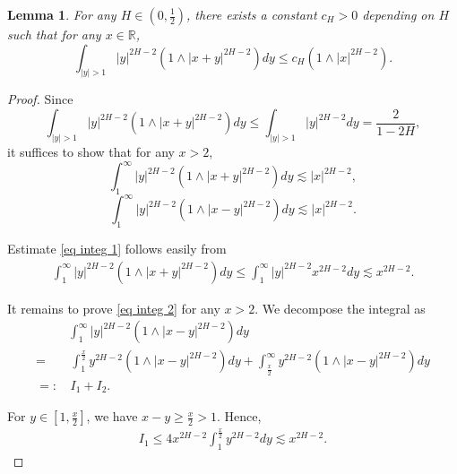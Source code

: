 \documentclass[11pt,reqno]{amsart}
\numberwithin{equation}{section}
\newtheorem{lemma}{Lemma}[section]
\newcommand{\1}{{\bf 1}}
\newcommand{\2}{{\bf 2}}
\begin{document}
 
\begin{lemma}\label{lem integ} For any $H\in (0,\frac12)$, there exists a constant  $c_H>0$ depending on $H$ such that for any $x\in\mathbb{R}$,
 \begin{equation}\label{eq integ aim0}
 \int_{|y|>1}|y|^{2H-2} \left(1\wedge |x+y|^{2H-2}\right)dy\le c_H\left(1\wedge |x|^{2H-2}\right).
\end{equation}
\end{lemma}
\begin{proof}
Since
 \begin{equation*}
 \int_{|y|>1}|y|^{2H-2} \left(1\wedge |x+y|^{2H-2}\right)dy\le \int_{|y|>1}|y|^{2H-2}dy=\frac{2}{1-2H},
\end{equation*} 
it suffices to show that for any $x>2$,
\begin{equation}\label{eq integ 1}
\int_{1}^{\infty}|y|^{2H-2}\left(1\wedge |x+y|^{2H-2}\right)dy\lesssim   |x|^{2H-2},
\end{equation}
\begin{equation}\label{eq integ 2}
\int_{1}^{\infty}|y|^{2H-2}\left(1\wedge |x-y|^{2H-2}\right)dy \lesssim   |x|^{2H-2}.
\end{equation}

Estimate \eqref{eq integ 1} follows easily from 
\begin{align*}
\int_{1}^{\infty}|y|^{2H-2}\left(1\wedge |x+y|^{2H-2}\right) dy \le \int_{1}^{\infty}|y|^{2H-2} x^{2H-2}dy\lesssim x^{2H-2}.
\end{align*}

It remains to prove \eqref{eq integ 2}  for any $x>2$. We decompose the integral as 
\begin{equation}\label{eq integ 3}
\begin{split}
&\int_{1}^{\infty}|y|^{2H-2}\left(1\wedge |x-y|^{2H-2}\right)dy\\
 =&\, \int_{1}^{\frac{x}2}y^{2H-2}\left(1\wedge |x-y|^{2H-2}\right)dy+\int_{\frac{x}{2}}^{\infty}y^{2H-2}\left(1\wedge |x-y|^{2H-2}\right)dy  \\
 =:&\, I_1+I_2.  
\end{split}
\end{equation}

For  $y\in [1,\frac{x}2]$,  we have $x-y\ge \frac{x}{2}>1$.  Hence, 
 \begin{align}\label{eq integ 31}
{I_1}\le4 x^{2H-2}\int_1^{\frac{x}2}y^{2H-2}dy\lesssim x^{2H-2}.
\end{align}


\end{proof}
\end{document}
